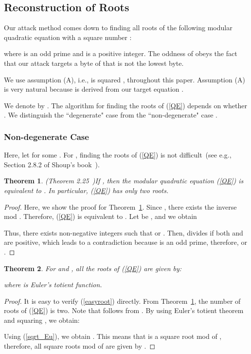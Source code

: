 \documentclass{article}
\newtheorem{thm}{Theorem}
\begin{document}
\subsection{Reconstruction of Roots}\label{roots}
Our attack method comes down to finding all roots of the following 
modular quadratic equation with a square number :

where  is an odd prime and  is a positive integer. 
The oddness of  obeys the fact that our attack targets a byte of  that is not the lowest byte.

We use assumption (A), i.e.,  is squared , throughout this paper. 
Assumption (A) is very natural because  is derived from 
our target equation . 

We denote  by . 
The algorithm for finding the roots of (\ref{QE}) depends on whether . 
We distinguish the ``degenerate" case  
from the ``non-degenerate" case .

\subsubsection{Non-degenerate Case}

Here, let  for some .
For , finding the roots of (\ref{QE}) 
is not difficult~(see e.g., Section 2.8.2 of Shoup's book~\cite{Shoup_book}). 
\begin{thm}(Theorem 2.25~\cite{Shoup_book})\label{justtwo}
If , then the modular quadratic equation (\ref{QE}) 
is equivalent to . 
In particular, (\ref{QE}) has only two roots.
\end{thm}
\begin{proof}
Here, we show the proof for Theorem~\ref{justtwo}. 
Since , there exists the inverse  mod . 
Therefore, (\ref{QE}) is equivalent to .
Let  be , and we obtain

Thus, there exists non-negative integers  such that 
 or . 
Then,  divides  if both  and  are positive, 
which leads to a contradiction because  is an odd prime, therefore, 
 or .
\end{proof}

\begin{thm}
For  and , all the roots of (\ref{QE}) are given by:

where  is Euler's totient function.
\end{thm}
\begin{proof}
It is easy to verify (\ref{easyroot}) directly. 
From Theorem~\ref{justtwo}, the number of roots of (\ref{QE}) is two. 
Note that  follows from 
.
By using Euler's totient theorem  and squaring , we obtain:

Using (\ref{sqrt_Eu}), we obtain
.
This means that  is a square root mod  of , 
therefore, all square roots mod  of  are given by .
\end{proof}
\end{document}
